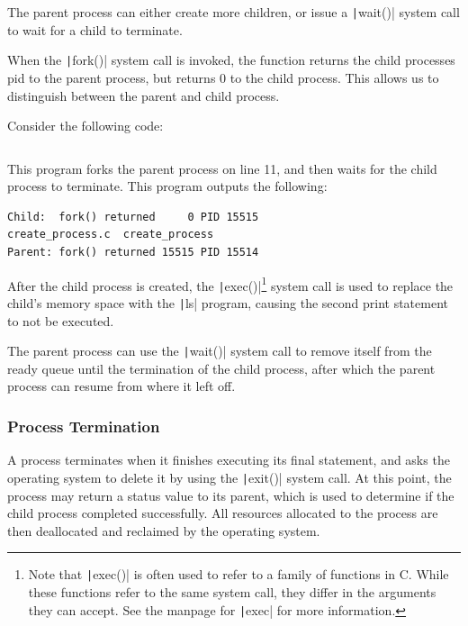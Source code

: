 \documentclass{article}
\begin{document}
The parent process can either create more children, or issue a
\texttt|wait()| system call to wait for a child to terminate.

When the \texttt|fork()| system call is invoked, the function
returns the child processes pid to the parent process, but returns 0 to
the child process. This allows us to distinguish between the parent and
child process.

Consider the following code: \inputminted{c}{code/create_process.c}
This program forks the parent process on line 11, and then waits for
the child process to terminate. This program outputs the following:
\begin{verbatim}
Child:  fork() returned     0 PID 15515
create_process.c  create_process
Parent: fork() returned 15515 PID 15514
\end{verbatim}
After the child process is created, the
\texttt|exec()|\footnote{Note that \texttt|exec()|
is often used to refer to a family of functions in C. While these
functions refer to the same system call, they differ in the arguments
they can accept. See the manpage for \texttt|exec| for more
information.} system call is used to replace the child's memory space
with the \texttt|ls| program, causing the second print
statement to not be executed.

The parent process can use the \texttt|wait()| system call to
remove itself from the ready queue until the termination of the child
process, after which the parent process can resume from where it left
off.
\subsubsection{Process Termination}
A process terminates when it finishes executing its final statement,
and asks the operating system to delete it by using the
\texttt|exit()| system call. At this point, the process may
return a status value to its parent, which is used to determine if the
child process completed successfully. All resources allocated to the
process are then deallocated and reclaimed by the operating system.
\end{document}
